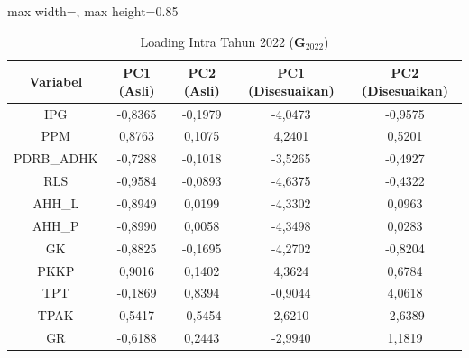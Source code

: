 \begin{table}[H]
\centering
\caption{Loading Intra Tahun 2022 ($\mathbf{G}_{2022}$)} \label{tab:app2loading_intra_2022}
\begin{adjustbox}{max width=\textwidth, max height=0.85\textheight}
\begin{tabular}{|c|c|c|c|c|}
\hline
\textbf{Variabel} & \textbf{PC1 (Asli)} & \textbf{PC2 (Asli)} & \textbf{PC1 (Disesuaikan)} & \textbf{PC2 (Disesuaikan)} \\
\hline
IPG & -0,8365 & -0,1979 & -4,0473 & -0,9575 \\
PPM & 0,8763 & 0,1075 & 4,2401 & 0,5201 \\
PDRB\_ADHK & -0,7288 & -0,1018 & -3,5265 & -0,4927 \\
RLS & -0,9584 & -0,0893 & -4,6375 & -0,4322 \\
AHH\_L & -0,8949 & 0,0199 & -4,3302 & 0,0963 \\
AHH\_P & -0,8990 & 0,0058 & -4,3498 & 0,0283 \\
GK & -0,8825 & -0,1695 & -4,2702 & -0,8204 \\
PKKP & 0,9016 & 0,1402 & 4,3624 & 0,6784 \\
TPT & -0,1869 & 0,8394 & -0,9044 & 4,0618 \\
TPAK & 0,5417 & -0,5454 & 2,6210 & -2,6389 \\
GR & -0,6188 & 0,2443 & -2,9940 & 1,1819 \\
\hline
\end{tabular}
\end{adjustbox}
\end{table}